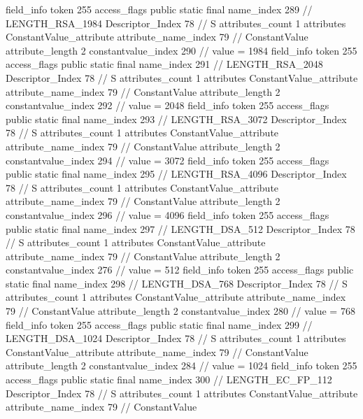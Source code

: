 {{{{{			}
			field_info {
				token	255
				access_flags	public static final
				name_index	289		// LENGTH_RSA_1984
				Descriptor_Index	78		// S
				attributes_count	1
				attributes {
				ConstantValue_attribute {
					attribute_name_index	79		// ConstantValue
					attribute_length	2
					constantvalue_index	290		// value = 1984
				}
				}
			}
			field_info {
				token	255
				access_flags	public static final
				name_index	291		// LENGTH_RSA_2048
				Descriptor_Index	78		// S
				attributes_count	1
				attributes {
				ConstantValue_attribute {
					attribute_name_index	79		// ConstantValue
					attribute_length	2
					constantvalue_index	292		// value = 2048
				}
				}
			}
			field_info {
				token	255
				access_flags	public static final
				name_index	293		// LENGTH_RSA_3072
				Descriptor_Index	78		// S
				attributes_count	1
				attributes {
				ConstantValue_attribute {
					attribute_name_index	79		// ConstantValue
					attribute_length	2
					constantvalue_index	294		// value = 3072
				}
				}
			}
			field_info {
				token	255
				access_flags	public static final
				name_index	295		// LENGTH_RSA_4096
				Descriptor_Index	78		// S
				attributes_count	1
				attributes {
				ConstantValue_attribute {
					attribute_name_index	79		// ConstantValue
					attribute_length	2
					constantvalue_index	296		// value = 4096
				}
				}
			}
			field_info {
				token	255
				access_flags	public static final
				name_index	297		// LENGTH_DSA_512
				Descriptor_Index	78		// S
				attributes_count	1
				attributes {
				ConstantValue_attribute {
					attribute_name_index	79		// ConstantValue
					attribute_length	2
					constantvalue_index	276		// value = 512
				}
				}
			}
			field_info {
				token	255
				access_flags	public static final
				name_index	298		// LENGTH_DSA_768
				Descriptor_Index	78		// S
				attributes_count	1
				attributes {
				ConstantValue_attribute {
					attribute_name_index	79		// ConstantValue
					attribute_length	2
					constantvalue_index	280		// value = 768
				}
				}
			}
			field_info {
				token	255
				access_flags	public static final
				name_index	299		// LENGTH_DSA_1024
				Descriptor_Index	78		// S
				attributes_count	1
				attributes {
				ConstantValue_attribute {
					attribute_name_index	79		// ConstantValue
					attribute_length	2
					constantvalue_index	284		// value = 1024
				}
				}
			}
			field_info {
				token	255
				access_flags	public static final
				name_index	300		// LENGTH_EC_FP_112
				Descriptor_Index	78		// S
				attributes_count	1
				attributes {
				ConstantValue_attribute {
					attribute_name_index	79		// ConstantValue
}}}}}}}
